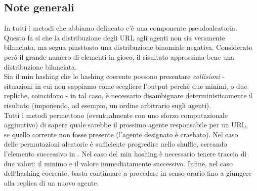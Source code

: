 \subsection{Note generali}
In tutti i metodi che abbiamo delineato c'è una componente pseudoaleatoria. Questo fa sí che la distribuzione degli URL agli agenti non sia veramente bilanciata, ma segua piusttosto una distribuzione binomiale negativa. Considerato peró il grande numero di elementi in gioco, il risultato approssima bene una distribuzione bilanciata.\\
Sia il min hashing che lo hashing coerente possono presentare \textit{collisioni} - situazioni in cui non sappiamo come scegliere l'output perchè due minimi, o due repliche, coincidono - in tal caso, è necessario disambiguare deterministicamente il risultato (imponendo, ad esempio, un ordine arbitrario sugli agenti).\\
Tutti i metodi permettono (eventualmente con uno sforzo computazionale aggiuntivo) di sapere quale sarebbe il prossimo agente responsabile per un URL, se quello corrente non fosse presente (l'agente designato è crashato). Nel caso delle permutazioni aleatorie è sufficiente progredire nello shuffle, cercando l'elemento successivo in . Nel caso del min hashing è necessario tenere traccia di due valori: il minimo e il valore immediatamente successivo. Infine, nel caso dell'hashing coerente, basta continuare a procedere in senso orario fino a giungere alla replica di un nuovo agente.